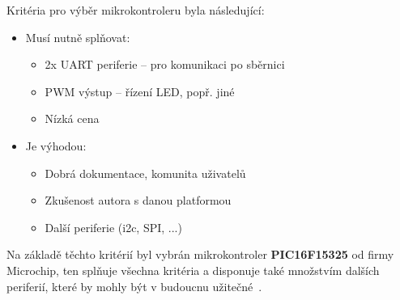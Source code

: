         Kritéria pro výběr mikrokontroleru byla následující:
        \begin{itemize}
            \item Musí nutně splňovat:
            \begin{itemize}
                \item 2x UART periferie -- pro komunikaci po sběrnici 
                \item PWM výstup -- řízení LED, popř. jiné
                \item Nízká cena 
            \end{itemize}
            \item Je výhodou:
            \begin{itemize}
                \item Dobrá dokumentace, komunita uživatelů
                \item Zkušenost autora s danou platformou
                \item Další periferie (\acs{i2c}, SPI, ...)
            \end{itemize}
        \end{itemize}

        Na základě těchto kritérií byl vybrán mikrokontroler \textbf{PIC16F15325} od firmy Microchip, ten splňuje všechna kritéria a disponuje také množstvím dalších periferií, které by mohly být v budoucnu užitečné~\cite{PIC16F15325}. 